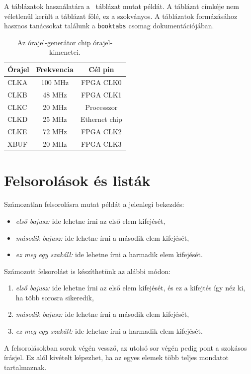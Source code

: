 A táblázatok használatára a ~táblázat mutat példát. A táblázat címkéje nem véletlenül került a táblázat fölé, ez a szokványos. A táblázatok formázásához hasznos tanácsokat találunk a \verb+booktabs+ csomag dokumentációjában.

\begin{table}[ht]
	\footnotesize
	\centering
	\caption{Az órajel-generátor chip órajel-kimenetei.} \label{tab:SysClocks}
	\begin{tabular}{ l c c }
		\toprule
		Órajel & Frekvencia & Cél pin \\
		\midrule
		CLKA & 100 MHz & FPGA CLK0\\
		CLKB & 48 MHz  & FPGA CLK1\\
		CLKC & 20 MHz  & Processzor\\
		CLKD & 25 MHz  & Ethernet chip \\
		CLKE & 72 MHz  & FPGA CLK2\\
		XBUF & 20 MHz  & FPGA CLK3\\
		\bottomrule
	\end{tabular}
	\label{tab:TabularExample}
\end{table}


\section{Felsorolások és listák}
Számozatlan felsorolásra mutat példát a jelenlegi bekezdés:
\begin{itemize}
	\item \emph{első bajusz:} ide lehetne írni az első elem kifejését,
	\item \emph{második bajusz:} ide lehetne írni a második elem kifejését,
	\item \emph{ez meg egy szakáll:} ide lehetne írni a harmadik elem kifejését.
\end{itemize}

Számozott felsorolást is készíthetünk az alábbi módon:
\begin{enumerate}
	\item \emph{első bajusz:} ide lehetne írni az első elem kifejését, és ez a kifejtés így néz ki, ha több sorosra sikeredik,
	\item \emph{második bajusz:} ide lehetne írni a második elem kifejését,
	\item \emph{ez meg egy szakáll:} ide lehetne írni a harmadik elem kifejését.
\end{enumerate}
A felsorolásokban sorok végén vessző, az utolsó sor végén pedig pont a szokásos írásjel. Ez alól kivételt képezhet, ha az egyes elemek több teljes mondatot tartalmaznak.

